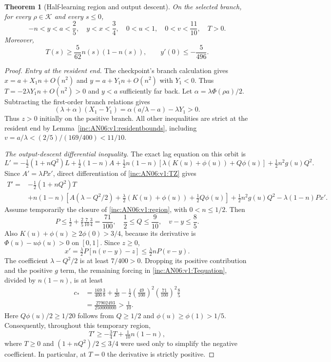 \documentclass[11pt]{article}
\numberwithin{equation}{section}
\newtheorem{theorem}{Theorem}[section]
\theoremstyle{remark}\newtheorem{remark}[theorem]{Remark}
\newcommand{\1}{\mathbf 1}
\begin{document}
\begin{theorem}[Half-learning region and output descent]
\label{inc:AN06:v1:regiontheorem}
On the selected branch, for every $\rho\in\mathcal K$ and every $s\le0$,
\begin{equation}\label{inc:AN06:v1:region}
 -n<y<a<\frac25,\quad y<x<\frac34,\quad
 0<u<1,\quad 0<v<\frac{11}{10},\quad T>0.
\end{equation}
Moreover,
\begin{equation}\label{inc:AN06:v1:Tlower}
 T(s)\ge\frac5{62}n(s)(1-n(s)),\qquad
 y'(0)\le-\frac5{496}.
\end{equation}
\end{theorem}
\begin{proof}
\emph{Entry at the resident end.}
The checkpoint's branch calculation gives
$x=a+X_1n+O(n^2)$ and $y=a+Y_1n+O(n^2)$ with $Y_1<0$.
Thus $T=-2\lambda Y_1n+O(n^2)>0$ and $y<a$ sufficiently far back.
Let $\alpha=\lambda\Phi(\rho a)/2$. Subtracting the first-order branch
relations gives
\[
 (\lambda+\alpha)(X_1-Y_1)
 =\alpha(a/\lambda-a)-\lambda Y_1>0.
\]
Thus $z>0$ initially on the positive branch. All other inequalities are
strict at the resident end by Lemma~\ref{inc:AN06:v1:residentbounds},
including $v=a/\lambda<(2/5)/(169/400)<11/10$.

\emph{The output-descent differential inequality.}
The exact lag equation on this orbit is
\[
 L'=-\tfrac12(1+nQ^2)L+\tfrac12(1-n)A
 +\tfrac12n(1-n)[\lambda(K(u)+\phi(u))+Q\phi(u)]
 +\tfrac12n^2g(u)Q^2.
\]
Since $A'=\lambda P x'$, direct differentiation of
\eqref{inc:AN06:v1:TZ} gives
\begin{align}
 T'={}&-\tfrac12(1+nQ^2)T\nonumber\\
 &+n(1-n)\left[A(\lambda-Q^2/2)
       +\tfrac\lambda2(K(u)+\phi(u))+\tfrac12Q\phi(u)\right]
       +\tfrac12n^2g(u)Q^2
       -\lambda(1-n)P x'.
 \label{inc:AN06:v1:Tequation}
\end{align}
Assume temporarily the closure of \eqref{inc:AN06:v1:region}, with
$0<n\le1/2$. Then
\[
 P\le\tfrac12+\tfrac25\tfrac7{10}\tfrac34=\frac{71}{100},\quad
 \frac12\le Q\le\frac9{10},\quad v-y\le\frac85.
\]
Also $K(u)+\phi(u)\ge2\phi(0)>3/4$, because its derivative is
$\Phi(u)-u\phi(u)>0$ on $[0,1]$. Since $z\ge0$,
\[
 x'=\tfrac\lambda2 P[n(v-y)-z]
 \le\tfrac\lambda2 nP(v-y).
\]
The coefficient $\lambda-Q^2/2$ is at least $7/400>0$.
Dropping its positive contribution and the positive $g$ term, the remaining
forcing in \eqref{inc:AN06:v1:Tequation}, divided by $n(1-n)$, is at least
\begin{align*}
 c_*&=\frac{169}{400}\frac38+\frac1{20}
       -\frac12\left(\frac{49}{100}\right)^2
                \left(\frac{71}{100}\right)^2\frac85\\
 &=\frac{27902493}{250000000}>\frac1{10}.
\end{align*}
Here $Q\phi(u)/2\ge1/20$ follows from $Q\ge1/2$ and
$\phi(u)\ge\phi(1)>1/5$.
Consequently, throughout this temporary region,
\begin{equation}\label{inc:AN06:v1:Tinequality}
 T'\ge-\tfrac34 T+\tfrac1{10}n(1-n),
\end{equation}
where $T\ge0$ and $(1+nQ^2)/2\le3/4$ were used only to simplify the
negative coefficient. In particular, at $T=0$ the derivative is strictly
positive.


\end{proof}
\end{document}
